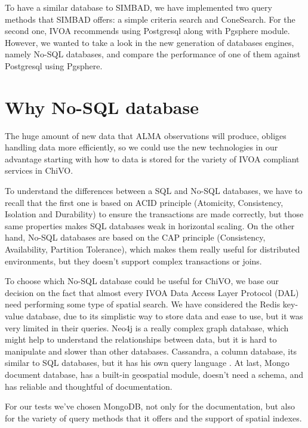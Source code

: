 \documentclass[11pt,twoside]{article}
\begin{document}
To have a similar database to SIMBAD, we have implemented two query methods that
SIMBAD offers: a simple criteria search and ConeSearch. For the second one, 
IVOA recommends using Postgresql along with Pgsphere module. 
However, we wanted to take a look in the new generation of databases engines, namely No-SQL databases, and compare the
performance of one of them against Postgresql using Pgsphere.


\section{Why No-SQL database}
    The huge amount of new data that ALMA observations will produce, obliges
    handling data more efficiently, so we could use the new technologies 
    in our advantage starting with how to data is stored for the variety
    of IVOA compliant services in ChiVO.
    
    To understand the differences between a SQL and No-SQL databases, we have
    to recall that the first one is based on ACID principle 
    (Atomicity, Consistency, Isolation and Durability) to ensure the
    transactions are made correctly, but those same properties
    makes SQL databases weak in horizontal scaling. On the other hand, No-SQL
    databases are based on the CAP principle (Consistency, Availability, Partition
    Tolerance), which makes them really useful for distributed environments, but 
    they doesn't support complex transactions or joins.

    To choose which No-SQL database could be useful for ChiVO, we base our
    decision on the fact that almost every
    IVOA Data Access Layer Protocol (DAL) need performing some type of spatial
    search. We have considered the Redis key-value database, due to its
    simplistic way to store data and ease to use, but it was very limited in
    their queries. Neo4j is a really complex graph database, which might help to
    understand the relationships between data, but it is hard to manipulate and slower 
    than other databases. Cassandra, a column database, its similar
    to SQL databases, but it has his own query language %
    . At last, Mongo document database, 
    has a built-in geospatial module, doesn't need a schema, and has reliable
    and thoughtful of documentation.

    For our tests we've chosen MongoDB, not only for the documentation, but also
    for the variety of query methods that it offers and the support of spatial indexes.
\end{document}
